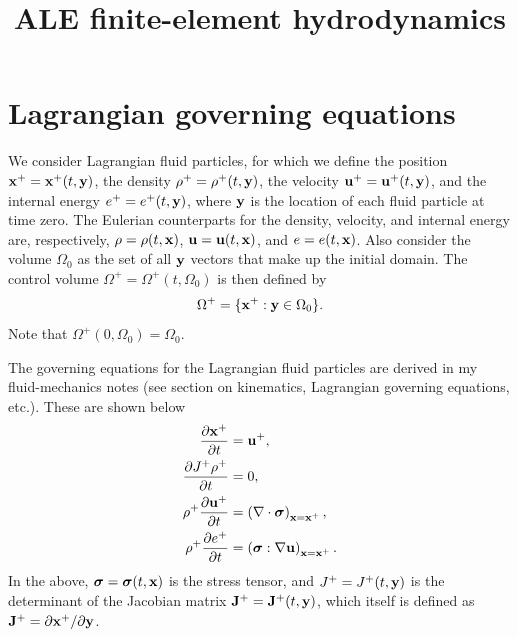 \documentclass[11pt]{article}
\title{ALE finite-element hydrodynamics}
\begin{document}
\maketitle

\section{Lagrangian governing equations}
We consider Lagrangian fluid particles, for which we define the position $\mathbf{x}^+=\mathbf{x}^+(t,\mathbf{y})$, the density $\rho^+ = \rho^+(t,\mathbf{y})$, the velocity $\mathbf{u}^+ = \mathbf{u}^+(t,\mathbf{y})$, and the internal energy $e^+ = e^+(t,\mathbf{y})$, where $
\mathbf{y}$ is the location of each fluid particle at time zero. The Eulerian counterparts for the density, velocity, and internal energy are, respectively, $\rho = \rho(t,\mathbf{x})$, $\mathbf{u} = \mathbf{u}(t,\mathbf{x})$, and $e = e(t,\mathbf{x})$. Also consider the volume $\Omega_0$ as the set of all $\mathbf{y}$ vectors that make up the initial domain. The control volume $\Omega^+ = \Omega^+(t, \Omega_0)$ is then defined by
\begin{equation}
    \Omega^+ = \{ \mathbf{x}^+:\mathbf{y} \in \Omega_0 \}.
\end{equation}
Note that $\Omega^+(0,\Omega_0) = \Omega_0$.

The governing equations for the Lagrangian fluid particles are derived in my fluid-mechanics notes (see section on kinematics, Lagrangian governing equations, etc.). These are shown below
\begin{align}
    \frac{\partial \mathbf{x}^+}{\partial t} &= \mathbf{u}^+, \label{eq:lag_gov_evol_x} \\
    \frac{\partial J^+ \rho^+}{\partial t} &= 0, \label{eq:lag_gov_evol_rho} \\
    \rho^+ \frac{\partial \mathbf{u}^+}{\partial t} &= \left ( \nabla \cdot \bm \sigma \right )_{\mathbf{x} = \mathbf{x}^+}, \label{eq:lag_gov_evol_u} \\
    \rho^+ \frac{\partial e^+}{\partial t} &= \left ( \bm \sigma : \nabla \mathbf{u} \right )_{\mathbf{x} = \mathbf{x}^+}. \label{eq:lag_gov_evol_e}
\end{align}
In the above, $\bm \sigma = \bm \sigma(t,\mathbf{x})$ is the stress tensor, and $J^+ = J^+(t,\mathbf{y})$ is the determinant of the Jacobian matrix $\mathbf{J}^+ = \mathbf{J}^+(t,\mathbf{y})$, which itself is defined as $\mathbf{J}^+ =  \partial \mathbf{x}^+ / \partial \mathbf{y}$. 
\end{document}
